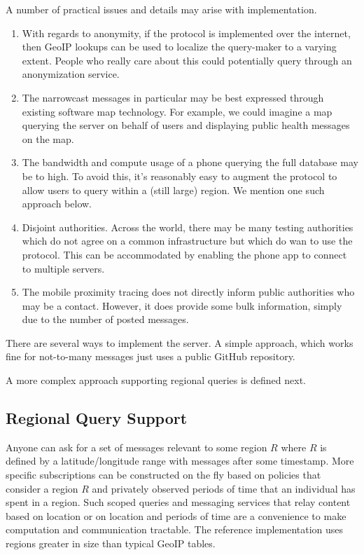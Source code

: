\documentclass{article}
\begin{document}
A number of practical issues and details may arise with implementation.
\begin{enumerate}
    \item With regards to anonymity, if the protocol is implemented over the internet, then GeoIP lookups can be used to localize the query-maker to a varying extent.  People who really care about this could potentially query through an anonymization service.
    \item The narrowcast messages in particular may be best expressed through existing software map technology.   For example, we could imagine a map querying the server on behalf of users and displaying public health messages on the map.  
    \item The bandwidth and compute usage of a phone querying the full database may be to high.  To avoid this, it's reasonably easy to augment the protocol to allow users to query within a (still large) region.  We mention one such approach below.  
    \item Disjoint authorities.  Across the world, there may be many testing authorities which do not agree on a common infrastructure but which do wan to use the protocol.  This can be accommodated by enabling the phone app to connect to multiple servers. 
    \item The mobile proximity tracing does not directly inform public authorities who may be a contact.  However, it does provide some bulk information, simply due to the number of posted messages. 
\end{enumerate}

There are several ways to implement the server.  A simple approach, which works fine for not-to-many messages just uses a public GitHub repository.

A more complex approach supporting regional queries is defined next.  

\subsection{Regional Query Support}
Anyone can ask for a set of messages relevant to some region $R$ where $R$ is defined by a latitude/longitude range with messages after some timestamp.  More specific subscriptions can be constructed on the fly based on policies that consider a region $R$ and privately observed periods of time that an individual has spent in a region. Such scoped queries and messaging services that relay content based on location or on location and periods of time are a convenience to make computation and communication tractable.  The reference implementation uses regions greater in size than typical GeoIP tables.
\end{document}
